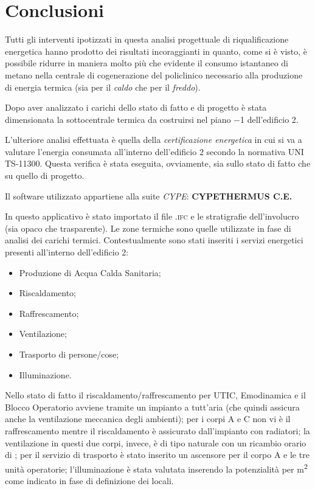 \chapter{Conclusioni}
\thispagestyle{empty}
Tutti gli interventi ipotizzati in questa analisi progettuale di riqualificazione energetica hanno prodotto dei risultati incoraggianti in quanto, come si è visto, è possibile ridurre in maniera molto più che evidente il consumo istantaneo di metano nella centrale di cogenerazione del policlinico necessario alla produzione di energia termica (sia per il \emph{caldo} che per il \emph{freddo}).

Dopo aver analizzato i carichi dello stato di fatto e di progetto è stata dimensionata la sottocentrale termica da costruirsi nel piano \num{-1} dell'edificio 2. 

L'ulteriore analisi effettuata è quella della \emph{certificazione energetica} in cui si va a valutare l'energia consumata all'interno dell'edificio 2 secondo la normativa UNI TS-11300. Questa verifica è stata eseguita, ovviamente, sia sullo stato di fatto che su quello di progetto.

Il software utilizzato appartiene alla suite \emph{CYPE}: \textbf{CYPETHERMUS C.E.}

In questo applicativo è stato importato il file \textsc{.ifc} e le stratigrafie dell'involucro (sia opaco che trasparente). Le zone termiche sono quelle utilizzate in fase di analisi dei carichi termici. Contestualmente sono stati inseriti i servizi energetici presenti all'interno dell'edificio 2:
\begin{itemize}
	\item Produzione di Acqua Calda Sanitaria;
	\item Riscaldamento;
	\item Raffrescamento;
	\item Ventilazione;
	\item Trasporto di persone/cose;
	\item Illuminazione.
\end{itemize}
Nello stato di fatto il riscaldamento/raffrescamento per UTIC, Emodinamica e il Blocco Operatorio avviene tramite un impianto a tutt'aria (che quindi assicura anche la ventilazione meccanica degli ambienti); per i corpi A e C non vi è il raffrescamento mentre il riscaldamento è assicurato dall'impianto con radiatori; la ventilazione in questi due corpi, invece, è di tipo naturale con un ricambio orario di ; per il servizio di trasporto è stato inserito un ascensore per il corpo A e le tre unità operatorie; l'illuminazione è stata valutata inserendo la potenzialità per \si{m^2} come indicato in fase di definizione dei locali.

